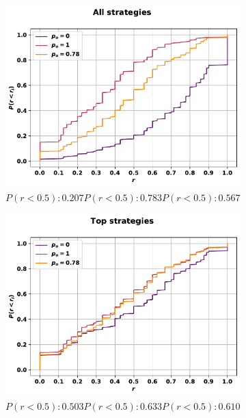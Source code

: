 \begin{figure}[!htbp]
    \begin{subfigure}{.45\textwidth}
    \includegraphics[width=\textwidth]{src/chapters/07/img/cfd_to_probability_all_strategies.pdf}
    \caption{\(P(r<0.5): 0.207 P(r<0.5): 0.783 P(r<0.5): 0.567\)}
    \end{subfigure}\hfill
    \begin{subfigure}{.45\textwidth}
    \includegraphics[width=\textwidth]{src/chapters/07/img/cfd_to_probability_top_strategies.pdf}
    \caption{\(P(r<0.5): 0.503 P(r<0.5): 0.633 P(r<0.5): 0.610\)}
    \end{subfigure}
    \begin{subfigure}{.45\textwidth}

\end{subfigure}
\end{figure}
